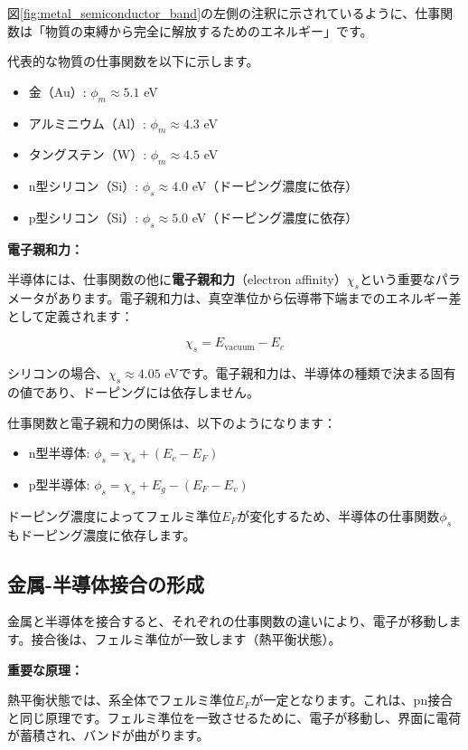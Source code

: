 図\ref{fig:metal_semiconductor_band}の左側の注釈に示されているように、仕事関数は「物質の束縛から完全に解放するためのエネルギー」です。

代表的な物質の仕事関数を以下に示します。
\begin{itemize}
\item 金（Au）: $\phi_m \approx 5.1$ eV
\item アルミニウム（Al）: $\phi_m \approx 4.3$ eV
\item タングステン（W）: $\phi_m \approx 4.5$ eV
\item n型シリコン（Si）: $\phi_s \approx 4.0$ eV（ドーピング濃度に依存）
\item p型シリコン（Si）: $\phi_s \approx 5.0$ eV（ドーピング濃度に依存）
\end{itemize}

\textbf{電子親和力：}

半導体には、仕事関数の他に\textbf{電子親和力}（electron affinity）$\chi_s$という重要なパラメータがあります。電子親和力は、真空準位から伝導帯下端までのエネルギー差として定義されます：

\begin{equation}
\chi_s = E_{\text{vacuum}} - E_c
\end{equation}

シリコンの場合、$\chi_s \approx 4.05$ eVです。電子親和力は、半導体の種類で決まる固有の値であり、ドーピングには依存しません。

仕事関数と電子親和力の関係は、以下のようになります：

\begin{itemize}
\item n型半導体: $\phi_s = \chi_s + (E_c - E_F)$
\item p型半導体: $\phi_s = \chi_s + E_g - (E_F - E_v)$
\end{itemize}

ドーピング濃度によってフェルミ準位$E_F$が変化するため、半導体の仕事関数$\phi_s$もドーピング濃度に依存します。

\subsection{金属-半導体接合の形成}

金属と半導体を接合すると、それぞれの仕事関数の違いにより、電子が移動します。接合後は、フェルミ準位が一致します（熱平衡状態）。

\textbf{重要な原理：}

熱平衡状態では、系全体でフェルミ準位$E_F$が一定となります。これは、pn接合と同じ原理です。フェルミ準位を一致させるために、電子が移動し、界面に電荷が蓄積され、バンドが曲がります。

